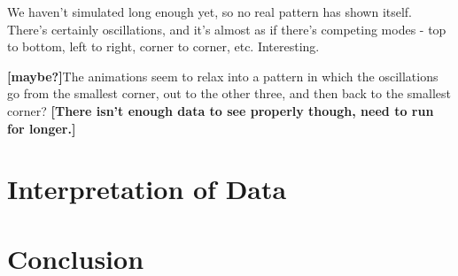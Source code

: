 \documentclass[letterpaper,twocolumn,amsmath,amssymb,pre]{revtex4-1}
\newcommand{\red}[1]{{\bf \color{red} #1}}
\newcommand{\fixme}[1]{\red{[#1]}}
\begin{document}
We haven't simulated long enough yet, so no real pattern has shown
itself.  There's certainly oscillations, and it's almost as if there's
competing modes - top to bottom, left to right, corner to corner, etc.
Interesting.

\fixme{maybe?}The animations seem to relax into a pattern in which the oscillations
go from the smallest corner, out to the other three, and then back to
the smallest corner?  \fixme{There isn't enough data to see properly
  though, need to run for longer.}


\section{Interpretation of Data}
\section{Conclusion}

\end{document}
